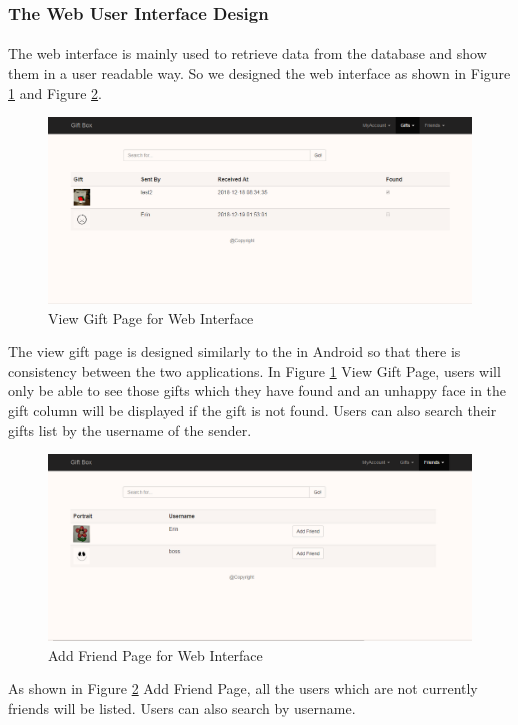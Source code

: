 \subsubsection{The Web User Interface Design}
\paragraph{} The web interface is mainly used to retrieve data from the database and show them in a user readable way. So we designed the web interface as shown in Figure \ref{ViewGift} and Figure \ref{AddFriends}.
\begin{figure}[htb]
\centering
\includegraphics[width=.9\textwidth]{section03/assets/ViewGifts.png}
\caption[View Gift Page for Web Interface]{\label{ViewGift}View Gift Page for Web Interface}
\end{figure}
\par The view gift page is designed similarly to the  in Android so that there is consistency between the two applications. In Figure \ref{ViewGift} View Gift Page, users will only be able to see those gifts which they have found and an unhappy face in the gift column will be displayed if the gift is not found. Users can also search their gifts list by the username of the sender.

\begin{figure}[htb]
\centering
\includegraphics[width=.9\textwidth]{section03/assets/AddFriends.png}
\caption[Add Friend Page for Web Interface]{\label{AddFriends}Add Friend Page for Web Interface}
\end{figure}
\par As shown in Figure \ref{AddFriends} Add Friend Page, all the users which are not currently friends will be listed. Users can also search by username. 


